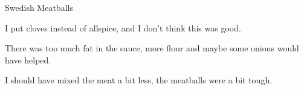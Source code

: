 \documentclass{recipe}
\begin{document}
\begin{recipe}{Swedish Meatballs}
  \begin{notes}
  \item I put cloves instead of allspice, and I don't think this was good.
  \item There was too much fat in the sauce, more flour and maybe some
    onions would have helped.
  \item I should have mixed the meat a bit less, the meatballs were a
    bit tough.
  \end{notes}
\end{recipe}
\end{document}
